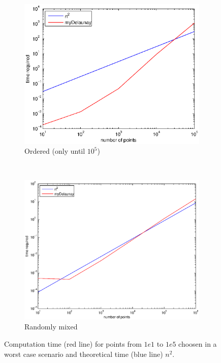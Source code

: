 \begin{figure}
\centering 
\begin{subfigure}[b]{0.5\textwidth}
\includegraphics[width=\textwidth]{images/timeWorstCaseOrdered.eps}
\caption{Ordered (only until $10^5$)}
\label{fig:timeWorstCaseOrdered}
\end{subfigure}
~
\begin{subfigure}[b]{0.45\textwidth}
\includegraphics[width=\textwidth]{images/timeWorstCaseRandomised.eps}
\caption{Randomly mixed}
\label{fig:timeWorstCaseRandomised}
\end{subfigure}
\caption{Computation time (red line) for points from $1e1$ to $1e5$ choosen in a worst case scenario and theoretical time (blue line) $n^2$.}
\end{figure}

